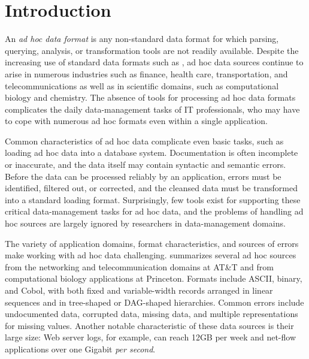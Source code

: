 \section{Introduction}
\label{sec:intro}


An {\em ad hoc data format} is any non-standard data format for which
parsing, querying, analysis, or transformation tools are not readily
available.  Despite the increasing use of standard data formats such
as \xml{}, ad hoc data sources continue to arise in numerous
industries such as finance, health care, transportation, and
telecommunications as well as in scientific domains, such as
computational biology and chemistry.  The absence of tools for
processing ad hoc data formats complicates the daily data-management
tasks of IT professionals, who may have to cope with numerous ad
hoc formats even within a single application.  

Common characteristics of ad hoc data complicate even basic tasks,
such as loading ad hoc data into a database system.  Documentation is
often incomplete or inaccurate, and the data itself may contain
syntactic and semantic errors.  Before the data can be processed
reliably by an application, errors must be identified, filtered out,
or corrected, and the cleansed data must be transformed into a
standard loading format.  Surprisingly, few tools exist for supporting
these critical data-management tasks for ad hoc data, and the problems
of handling ad hoc sources are largely ignored by researchers in
data-management domains.




The variety of application domains, format characteristics, and
sources of errors make working with ad hoc data challenging.
 summarizes several ad hoc sources from the
networking and telecommunication domains at AT\&T and from
computational biology applications at Princeton.  Formats include
ASCII, binary, and Cobol, with both fixed and variable-width records
arranged in linear sequences and in tree-shaped or DAG-shaped
hierarchies.  Common errors include undocumented data, corrupted data,
missing data, and multiple representations for missing values.
Another notable characteristic of these data sources is their large
size: Web server logs, for example, can reach 12GB per week and net-flow
applications over one Gigabit \emph{per second}.


